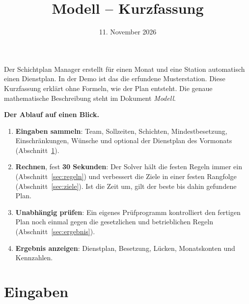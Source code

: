 \documentclass[11pt]{combiArticle}
\begin{document}
\title{Modell -- Kurzfassung}
\date{11. November 2026}
\maketitle

Der Schichtplan Manager erstellt für einen Monat und eine Station automatisch einen Dienstplan. In der Demo ist
das die erfundene Musterstation. Diese Kurzfassung erklärt ohne Formeln, wie der Plan entsteht. Die genaue
mathematische Beschreibung steht im Dokument \emph{Modell}.

\textbf{Der Ablauf auf einen Blick.}
\begin{enumerate}
  \item \textbf{Eingaben sammeln}: Team, Sollzeiten, Schichten, Mindestbesetzung, Einschränkungen, Wünsche und
        optional der Dienstplan des Vormonats (Abschnitt~\ref{sec:eingaben}).
  \item \textbf{Rechnen}, fest \textbf{30 Sekunden}: Der Solver hält die festen Regeln immer ein
        (Abschnitt~\ref{sec:regeln}) und verbessert die Ziele in einer festen Rangfolge
        (Abschnitt~\ref{sec:ziele}). Ist die Zeit um, gilt der beste bis dahin gefundene Plan.
  \item \textbf{Unabhängig prüfen}: Ein eigenes Prüfprogramm kontrolliert den fertigen Plan noch einmal gegen die
        gesetzlichen und betrieblichen Regeln (Abschnitt~\ref{sec:ergebnis}).
  \item \textbf{Ergebnis anzeigen}: Dienstplan, Besetzung, Lücken, Monatskonten und Kennzahlen.
\end{enumerate}

\section{Eingaben}\label{sec:eingaben}
\end{document}

